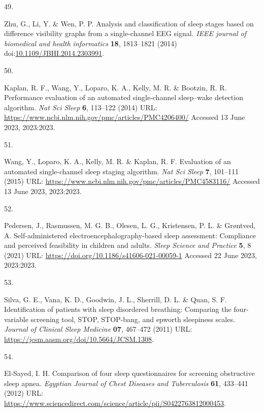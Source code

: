 \documentclass[
  10pt,
]{scrbook}
\newlength{\cslhangindent}
\newlength{\csllabelwidth}
\newlength{\cslentryspacingunit} %
\newenvironment{CSLReferences}[2] %
 {%
  \setlength{\parindent}{0pt}
  \ifodd #1
  \let\oldpar\par
  \def\par{\hangindent=\cslhangindent\oldpar}
  \fi
  \setlength{\parskip}{#2\cslentryspacingunit}
 }%
 {}
\newcommand{\CSLLeftMargin}[1]{\parbox[t]{\csllabelwidth}{#1}}
\newcommand{\CSLRightInline}[1]{\parbox[t]{\linewidth - \csllabelwidth}{#1}\break}
\begin{document}
\begin{CSLReferences}{0}{0}
\leavevmode{}%
\CSLLeftMargin{49. }%
\CSLRightInline{Zhu, G., Li, Y. \& Wen, P. P. Analysis and
classification of sleep stages based on difference visibility graphs
from a single-channel EEG signal. \emph{IEEE journal of biomedical and
health informatics} \textbf{18}, 1813--1821 (2014)
doi:\href{https://doi.org/10.1109/JBHI.2014.2303991}{10.1109/JBHI.2014.2303991}.}

\leavevmode{}%
\CSLLeftMargin{50. }%
\CSLRightInline{Kaplan, R. F., Wang, Y., Loparo, K. A., Kelly, M. R. \&
Bootzin, R. R. Performance evaluation of an automated single-channel
sleep--wake detection algorithm. \emph{Nat Sci Sleep} \textbf{6},
113--122 (2014) URL:
\url{https://www.ncbi.nlm.nih.gov/pmc/articles/PMC4206400/} Accessed 13
June 2023, 2023:2023.}

\leavevmode{}%
\CSLLeftMargin{51. }%
\CSLRightInline{Wang, Y., Loparo, K. A., Kelly, M. R. \& Kaplan, R. F.
Evaluation of an automated single-channel sleep staging algorithm.
\emph{Nat Sci Sleep} \textbf{7}, 101--111 (2015) URL:
\url{https://www.ncbi.nlm.nih.gov/pmc/articles/PMC4583116/} Accessed 13
June 2023, 2023:2023.}

\leavevmode{}%
\CSLLeftMargin{52. }%
\CSLRightInline{Pedersen, J., Rasmussen, M. G. B., Olesen, L. G.,
Kristensen, P. L. \& Grøntved, A. Self-administered
electroencephalography-based sleep assessment: Compliance and perceived
feasibility in children and adults. \emph{Sleep Science and Practice}
\textbf{5}, 8 (2021) URL:
\url{https://doi.org/10.1186/s41606-021-00059-1} Accessed 22 June 2023,
2023:2023.}

\leavevmode{}%
\CSLLeftMargin{53. }%
\CSLRightInline{Silva, G. E., Vana, K. D., Goodwin, J. L., Sherrill, D.
L. \& Quan, S. F. Identification of patients with sleep disordered
breathing: Comparing the four-variable screening tool, STOP, STOP-bang,
and epworth sleepiness scales. \emph{Journal of Clinical Sleep Medicine}
\textbf{07}, 467--472 (2011) URL:
\url{https://jcsm.aasm.org/doi/10.5664/JCSM.1308}.}

\leavevmode{}%
\CSLLeftMargin{54. }%
\CSLRightInline{El-Sayed, I. H. Comparison of four sleep questionnaires
for screening obstructive sleep apnea. \emph{Egyptian Journal of Chest
Diseases and Tuberculosis} \textbf{61}, 433--441 (2012) URL:
\url{https://www.sciencedirect.com/science/article/pii/S0422763812000453}.}


\end{CSLReferences}
\end{document}
